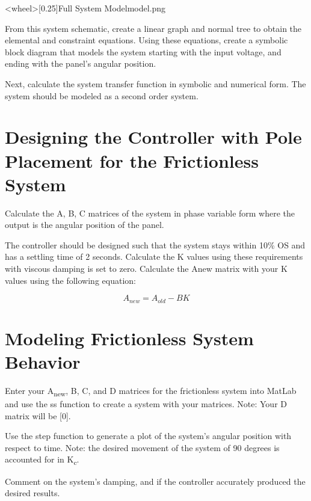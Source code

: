 \documentclass{homework}
\begin{document}
\img<wheel>[0.25]{Full System Model}{model.png}

\question From this system schematic, create a linear graph and normal tree to obtain the elemental and constraint equations. Using these equations, create a symbolic block diagram that models the system starting with the input voltage, and ending with the panel's angular position.

\question Next, calculate the system transfer function in symbolic and numerical form. The system should be modeled as a second order system.

\section*{Designing the Controller with Pole Placement for the Frictionless System}

\question Calculate the A, B, C matrices of the system in phase variable form where the output is the angular position of the panel.  

\question The controller should be designed such that the system stays within 10\% OS and has a settling time of 2 seconds. Calculate the K values using these requirements with viscous damping is set to zero. Calculate the Anew matrix with your K values using the following equation: 

\[ A_{new} = A_{old} - BK \]

\section*{Modeling Frictionless System Behavior}
\question Enter your A\textsubscript{new}, B, C, and D matrices for the frictionless system into MatLab and use the ss function to create a system with your matrices. Note: Your D matrix will be [0].

\question Use the step function to generate a plot of the system's angular position with respect to time. Note: the desired movement of the system of 90 degrees is accounted for in K\textsubscript{c}.

\question Comment on the system's damping, and if the controller accurately produced the desired results. 
\end{document}
